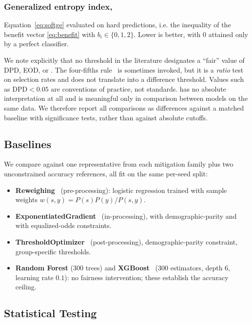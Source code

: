 \subsubsection{Generalized entropy index, \getwo{}}
Equation~\eqref{eq:softge} evaluated on hard predictions, i.e. the inequality
of the benefit vector \eqref{eq:benefit} with $b_i \in \{0,1,2\}$. Lower is
better, with $0$ attained only by a perfect classifier.

We note explicitly that no threshold in the literature designates a ``fair''
value of DPD, EOD, or \getwo{}. The four-fifths rule~\cite{eeoc1978uniform} is
sometimes invoked, but it is a \emph{ratio} test on selection rates and does
not translate into a difference threshold. Values such as $\mathrm{DPD}<0.05$
are conventions of practice, not standards. \getwo{} has no absolute
interpretation at all and is meaningful only in comparison between models on
the same data. We therefore report all comparisons as differences against a
matched baseline with significance tests, rather than against absolute cutoffs.

\subsection{Baselines}

We compare against one representative from each mitigation family plus two
unconstrained accuracy references, all fit on the same per-seed split:

\begin{itemize}
\item \textbf{Reweighing}~\cite{kamiran2012data} (pre-processing): logistic
      regression trained with sample weights
      $w(s,y) = P(s)P(y)/P(s,y)$.
\item \textbf{ExponentiatedGradient}~\cite{agarwal2018reductions}
      (in-processing), with demographic-parity and with equalized-odds
      constraints.
\item \textbf{ThresholdOptimizer}~\cite{hardt2016equality} (post-processing),
      demographic-parity constraint, group-specific thresholds.
\item \textbf{Random Forest} ($300$ trees) and
      \textbf{XGBoost}~\cite{chen2016xgboost} ($300$ estimators, depth $6$,
      learning rate $0.1$): no fairness intervention; these establish the
      accuracy ceiling.
\end{itemize}

\subsection{Statistical Testing}

